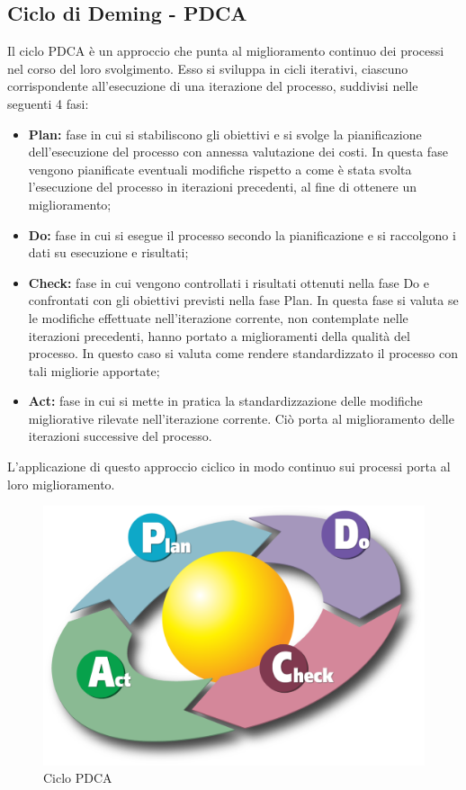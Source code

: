 \subsection{Ciclo di Deming - PDCA} \label{subsection:PDCA}
Il ciclo PDCA è un approccio che punta al miglioramento continuo dei processi nel corso del loro svolgimento. Esso si sviluppa in cicli iterativi, ciascuno corrispondente all'esecuzione di una iterazione del processo, suddivisi nelle seguenti 4 fasi:
\begin{itemize}
	\item \textbf{Plan:} fase in cui si stabiliscono gli obiettivi e si svolge la pianificazione dell'esecuzione del processo con annessa valutazione dei costi. In questa fase vengono pianificate eventuali modifiche rispetto a come è stata svolta l'esecuzione del processo in iterazioni precedenti, al fine di ottenere un miglioramento;
	\item \textbf{Do:} fase in cui si esegue il processo secondo la pianificazione e si raccolgono i dati su esecuzione e risultati;
	\item \textbf{Check:} fase in cui vengono controllati i risultati ottenuti nella fase Do e confrontati con gli obiettivi previsti nella fase Plan. In questa fase si valuta se le modifiche effettuate nell'iterazione corrente, non contemplate nelle iterazioni precedenti, hanno portato a miglioramenti della qualità del processo. In questo caso si valuta come rendere standardizzato il processo con tali migliorie apportate;
	\item \textbf{Act:} fase in cui si mette in pratica la standardizzazione delle modifiche migliorative rilevate nell'iterazione corrente. Ciò porta al miglioramento delle iterazioni successive del processo.
\end{itemize}
L'applicazione di questo approccio ciclico in modo continuo sui processi porta al loro miglioramento.

\begin{figure}[H]
	\centering
	\includegraphics[scale=0.2]{immagini/PDCA.png}
	\caption{Ciclo PDCA}
\end{figure}